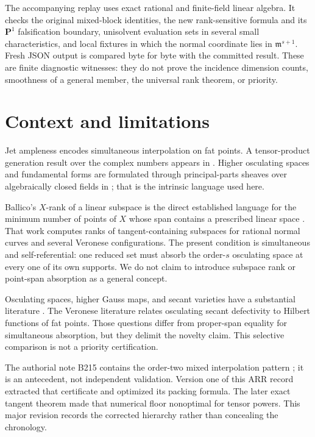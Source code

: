 \documentclass[11pt]{article}
\theoremstyle{definition}
\theoremstyle{remark}
\theoremstyle{plain}
\newcommand{\PP}{\mathbf P}
\begin{document}
The accompanying replay uses exact rational and finite-field linear algebra.
It checks the original mixed-block identities, the new rank-sensitive formula
and its $\PP^1$ falsification boundary, unisolvent evaluation sets in several
small characteristics, and local fixtures in which the normal coordinate lies
in $\mathfrak m^{s+1}$.  Fresh JSON output is compared byte for byte with the
committed result.  These are finite diagnostic witnesses: they do not prove
the incidence dimension counts, smoothness of a general member, the universal
rank theorem, or priority.

\section{Context and limitations}

Jet ampleness encodes simultaneous interpolation on fat points.  A
tensor-product generation result over the complex numbers appears in
\cite{BDRS1999}.  Higher osculating spaces and fundamental forms are
formulated through principal-parts sheaves over algebraically closed fields
in \cite{MallavibarrenaPiene2024}; that is the intrinsic language used here.

Ballico's $X$-rank of a linear subspace is the direct established language
for the minimum number of points of $X$ whose span contains a prescribed
linear space \cite{BallicoXRank2013}.  That work computes ranks of
tangent-containing subspaces for rational normal curves and several
Veronese configurations.  The present condition is simultaneous and
self-referential: one reduced set must absorb the order-$s$ osculating space
at every one of its own supports.  We do not claim to introduce subspace rank
or point-span absorption as a general concept.

Osculating spaces, higher Gauss maps, and secant varieties have a substantial
literature \cite{BallicoEtAl2004,BallicoFontanari2004,BernardiEtAl2009}.
The Veronese literature relates osculating secant defectivity to Hilbert
functions of fat points.  Those questions differ from proper-span equality
for simultaneous absorption, but they delimit the novelty claim.  This
selective comparison is not a priority certification.

The authorial note B215 contains the order-two mixed interpolation pattern
\cite{ErikssonB215}; it is an antecedent, not independent validation.
Version one of this ARR record extracted that certificate and optimized its
packing formula.  The later exact tangent theorem
\cite{ErikssonExactFloor2026} made that numerical floor nonoptimal for tensor
powers.  This major revision records the corrected hierarchy rather than
concealing the chronology.
\end{document}
